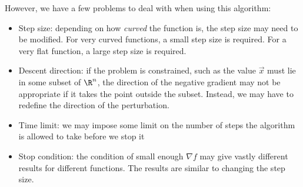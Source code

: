 \documentclass[../Main.tex]{subfiles}
\begin{document}
However, we have a few problems to deal with when using this algorithm:
\begin{itemize}
    \item Step size: depending on how \textit{curved} the function is, the step size may need to be modified. For very curved functions, a small step size is required. For a very flat function, a large step size is required.
    \item Descent direction: if the problem is constrained, such as the value $\vec{x}$ must lie in some subset of $\R^n$, the direction of the negative gradient may not be appropriate if it takes the point outside the subset. Instead, we may have to redefine the direction of the perturbation.
    \item Time limit: we may impose some limit on the number of steps the algorithm is allowed to take before we stop it
    \item Stop condition: the condition of small enough $\nabla f$ may give vastly different results for different functions. The results are similar to changing the step size.
\end{itemize}
\end{document}
